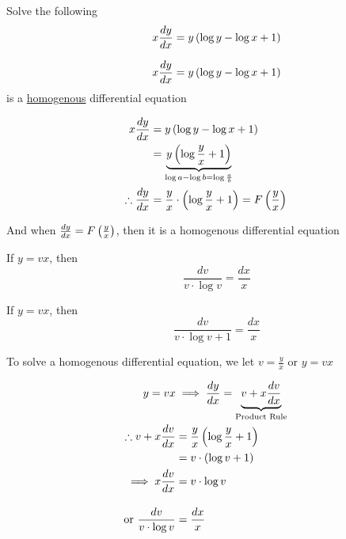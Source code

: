 \documentclass[14pt,fleqn]{extarticle}
\newcommand\yx{\frac{y}{x}}
\begin{document}
 
\begin{question}
	\statement 
    
     Solve the following 
     \[ \qquad x\frac{dy}{dx} = y \left(\log y - \log x + 1 \right)\] 
     
    \begin{step}
  \begin{options} 
     \correct 
       
     \[ \qquad x\frac{dy}{dx} = y \left(\log y - \log x + 1 \right)\]
     is a \underline{homogenous} differential equation 
        
    \end{options} 
     \reason 
     
     \begin{align}
	x\dydx &= y \left(\log y - \log x + 1 \right) \\
	&= \underbrace{y \left(\log \yx + 1 \right)}_{\log a - \log b = \log \frac{a}{b}} \\
	\therefore \dydx &= \yx\cdot \left(\log\yx + 1 \right) = F \left(\yx \right)
\end{align}

And when $\dydx = F \left(\yx \right)$, then it is a homogenous differential equation
       
\end{step}

\begin{step}
  \begin{options} 
     \correct 
       
      If $y = vx$, then 
      \[ \qquad \frac{dv}{v\cdot\log v} = \frac{dx}{x} \] 
     \incorrect
     
     If $y = vx$, then 
      \[ \qquad \frac{dv}{v\cdot\log v + 1} = \frac{dx}{x} \] 
        
    \end{options} 
     \reason 
     
     To solve a homogenous differential equation, we let $v = \yx$ or $y = vx$ 
     
     \begin{align}
     y = vx &\implies \dydx = \underbrace{v + x\frac{dv}{dx}}_{\text{Product Rule}} \\
     \therefore v + x\frac{dv}{dx} &= \yx \left(\log\yx + 1 \right) \\
     &= v\cdot \left(\log v + 1 \right) \\
     \implies x\frac{dv}{dx} &= v\cdot\log v \\[10pt]
     \text{or } \frac{dv}{v\cdot\log v} &= \frac{dx}{x} 
\end{align}
       

\end{step}
\end{question}
\end{document}
